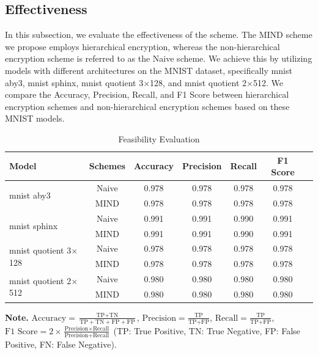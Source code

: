 \documentclass[conference]{IEEEtran}
\begin{document}
\subsection{Effectiveness}
In this subsection, we evaluate the effectiveness of the scheme. The MIND scheme we propose employs hierarchical encryption, whereas the non-hierarchical encryption scheme is referred to as the Naive scheme. We achieve this by utilizing models with different architectures on the MNIST dataset, specifically mnist aby3, mnist sphinx, mnist quotient 3$\times$128, and mnist quotient 2$\times$512. We compare the Accuracy, Precision, Recall, and F1 Score between hierarchical encryption schemes and non-hierarchical encryption schemes based on these MNIST models.

\begin{table}[ht]
\centering
\caption{Feasibility Evaluation}
\label{tab:effectiveness}
\begin{tabular}{lcccccc}
\toprule[1pt]
Model & Schemes & Accuracy & Precision & Recall & F1 Score  \\
\midrule[1pt]
\multirow{2}{*}{mnist aby3} & Naive & 0.978 & 0.978 & 0.978 & 0.978  \\
                            & MIND & 0.978 & 0.978 & 0.978 & 0.978  \\ \cline{1-6}
\multirow{2}{*}{mnist sphinx} & Naive & 0.991 & 0.991 & 0.990 & 0.991  \\
                            & MIND & 0.991 & 0.991 & 0.990 & 0.991  \\ \cline{1-6}
\multirow{2}{*}{mnist quotient 3$\times$128} & Naive & 0.978 & 0.978 & 0.978 & 0.978  \\
                            & MIND & 0.978 & 0.978 & 0.978 & 0.978  \\ \cline{1-6}
\multirow{2}{*}{mnist quotient 2$\times$512} & Naive & 0.980 & 0.980 & 0.980 & 0.980  \\
                            & MIND & 0.980 & 0.980 & 0.980 & 0.980  \\
\bottomrule[1pt]
\end{tabular}
\vspace{-6pt}
\begin{flushleft}
\begin{adjustwidth}{90pt}{70pt}  %
\textbf{Note.}
$\text{Accuracy} = \frac{\text{TP} + \text{TN}}{\text{TP} + \text{TN} + \text{FP} + \text{FP}}$,
$\text{Precision} = \frac{\text{TP}}{\text{TP} + \text{FP}}$,
$\text{Recall} = \frac{\text{TP}}{\text{TP} + \text{FP}}$,
$\text{F1 Score} = 2 \times \frac{\text{Precision} \times \text{Recall}}{\text{Precision} + \text{Recall}}$ 
(TP: True Positive, TN: True Negative, FP: False Positive, FN: False Negative).
\end{adjustwidth}
\end{flushleft}
\end{table}
\end{document}
